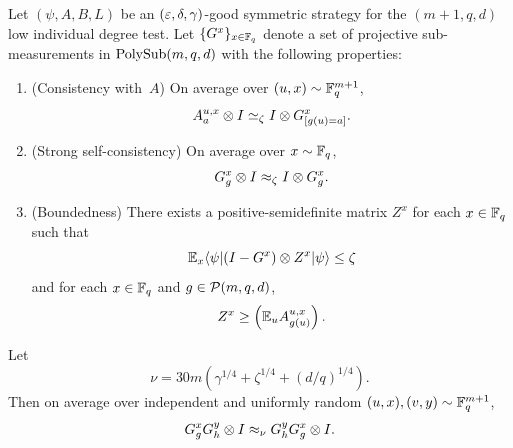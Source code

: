 \begin{theorem}[Commutativity of~$G$]\label{thm:com-main}
	\leanok
	Let $(\psi,A,B,L)$ be an $(\varepsilon,\delta,\gamma)$-good symmetric strategy for the $(m+1,q,d)$ low individual degree test.
	Let $\{G^x\}_{x \in \mathbb{F}_q}$ denote a set of projective sub-measurements in $\mathrm{PolySub}(m,q,d)$ with the following properties:
	\begin{enumerate}
		\item (Consistency with~$A$)\label{item:commuting-consistency}
		      On average over $(u,x) \sim \mathbb{F}_q^{m+1}$,
		      \[
			      A_a^{u,x} \otimes I \simeq_\zeta I \otimes G^x_{[g(u)=a]}.
		      \]
		\item (Strong self-consistency)\label{item:commuting-self-consistency}
		      On average over $x \sim \mathbb{F}_q$,
		      \[
			      G_g^x \otimes I \approx_\zeta I \otimes G_g^x.
		      \]
		\item (Boundedness)\label{item:commuting-boundedness}
		      There exists a positive-semidefinite matrix $Z^x$ for each $x \in \mathbb{F}_q$ such that
		      \[
			      \mathbb{E}_x \langle \psi \rvert (I-G^x) \otimes Z^x \lvert \psi \rangle \le \zeta
		      \]
		      and for each $x \in \mathbb{F}_q$ and $g \in \mathcal{P}(m,q,d)$,
		      \[
			      Z^x \ge \left(\mathbb{E}_u A_{g(u)}^{u,x}\right).
		      \]
	\end{enumerate}
	Let
	\[
		\nu = 30m\left(\gamma^{1/4}+\zeta^{1/4}+(d/q)^{1/4}\right).
	\]
	Then on average over independent and uniformly random $(u,x),(v,y) \sim \mathbb{F}_q^{m+1}$,
	\[
		G_g^x G_h^y \otimes I \approx_\nu G_h^y G_g^x \otimes I.
	\]
\end{theorem}
